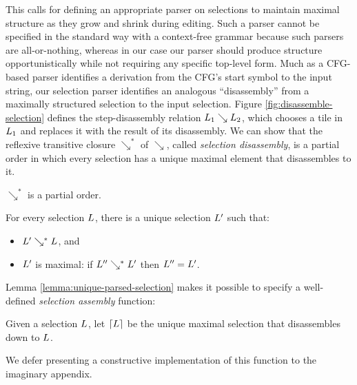 This calls for defining an appropriate
parser on selections to maintain
maximal structure as they grow and shrink during editing.
Such a parser cannot be specified in the standard way
with a context-free grammar because such parsers are
all-or-nothing, whereas in our case our parser should
produce structure opportunistically while not requiring any
specific top-level form.
Much as a CFG-based parser identifies a derivation from
the CFG's start symbol to the input string,
our selection parser identifies an analogous ``disassembly'' from
a maximally structured selection to the input selection.
Figure \ref{fig:disassemble-selection} defines the step-disassembly relation $L_1\searrow L_2$,
which chooses a tile in $L_1$ and replaces it with the
result of its disassembly.
We can show that the reflexive transitive
closure $\searrow^*$ of $\searrow$, called \emph{selection disassembly},
is a partial order in
which every selection has a unique maximal element that
disassembles to it.
\begin{lemma}
  $\searrow^*$ is a partial order.
\end{lemma}
\begin{lemma}\label{lemma:unique-parsed-selection}
  For every selection $L$, there is a unique
  selection $L'$ such that:
  \begin{itemize}
  \item $L'\searrow^*L$, and
  \item $L'$ is maximal: if $L''\searrow^*L'$ then $L'' = L'$.
  \end{itemize}
\end{lemma}
Lemma \ref{lemma:unique-parsed-selection} makes it
possible to specify a well-defined \emph{selection assembly}
function:
\begin{definition}
  Given a selection $L$, let $\left\lceil L\right\rceil$ be
  the unique maximal selection that disassembles down
  to $L$.
\end{definition}
We defer presenting a constructive implementation of this function
to the imaginary appendix.




